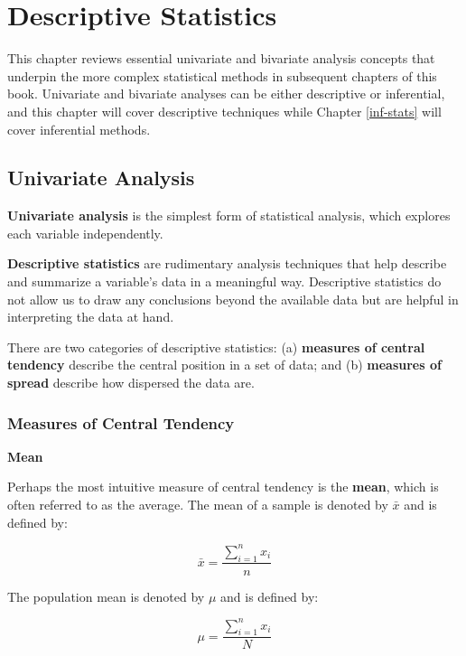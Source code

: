 \documentclass[]{book}
\begin{document}
\hypertarget{desc-stats}{%
\chapter{Descriptive Statistics}\label{desc-stats}}

This chapter reviews essential univariate and bivariate analysis concepts that underpin the more complex statistical methods in subsequent chapters of this book. Univariate and bivariate analyses can be either descriptive or inferential, and this chapter will cover descriptive techniques while Chapter \ref{inf-stats} will cover inferential methods.

\hypertarget{univariate-analysis}{%
\section{Univariate Analysis}\label{univariate-analysis}}

\textbf{Univariate analysis} is the simplest form of statistical analysis, which explores each variable independently.

\textbf{Descriptive statistics} are rudimentary analysis techniques that help describe and summarize a variable's data in a meaningful way. Descriptive statistics do not allow us to draw any conclusions beyond the available data but are helpful in interpreting the data at hand.

There are two categories of descriptive statistics: (a) \textbf{measures of central tendency} describe the central position in a set of data; and (b) \textbf{measures of spread} describe how dispersed the data are.

\hypertarget{measures-of-central-tendency}{%
\subsection{Measures of Central Tendency}\label{measures-of-central-tendency}}

\textbf{Mean}

Perhaps the most intuitive measure of central tendency is the \textbf{mean}, which is often referred to as the average. The mean of a sample is denoted by \(\bar{x}\) and is defined by:

\[ \bar{x} = \frac{\displaystyle\sum_{i=1}^{n} x_{i}}{n} \]

The population mean is denoted by \(\mu\) and is defined by:

\[ \mu = \frac{\displaystyle\sum_{i=1}^{n} x_{i}}{N} \]
\end{document}
